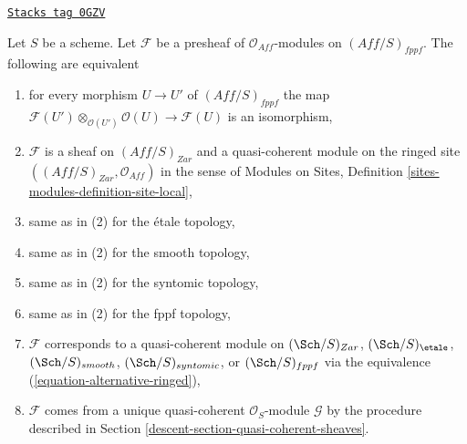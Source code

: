 \begin{lemma}
\label{descent-lemma-quasi-coherent-alternative}
\href{https://stacks.math.columbia.edu/tag/0GZV}{\texttt{Stacks tag 0GZV}}

Let $S$ be a scheme. Let $\mathcal{F}$ be a presheaf
of $\mathcal{O}_{\textit{Aff}}$-modules on $(\textit{Aff}/S)_{fppf}$.
The following are equivalent
\begin{enumerate}
\item for every morphism $U \to U'$ of $(\textit{Aff}/S)_{fppf}$ the map
$\mathcal{F}(U') \otimes_{\mathcal{O}(U')} \mathcal{O}(U) \to \mathcal{F}(U)$
is an isomorphism,
\item $\mathcal{F}$ is a sheaf on $(\textit{Aff}/S)_{Zar}$ and
a quasi-coherent module on the ringed site
$((\textit{Aff}/S)_{Zar}, \mathcal{O}_{\textit{Aff}})$ in the sense of
Modules on Sites, Definition \ref{sites-modules-definition-site-local},
\item same as in (2) for the \'etale topology,
\item same as in (2) for the smooth topology,
\item same as in (2) for the syntomic topology,
\item same as in (2) for the fppf topology,
\item $\mathcal{F}$ corresponds to a quasi-coherent module on
$(\Sch/S)_{Zar}$,
$(\Sch/S)_\etale$,
$(\Sch/S)_{smooth}$,
$(\Sch/S)_{syntomic}$, or
$(\Sch/S)_{fppf}$
via the equivalence (\ref{equation-alternative-ringed}),
\item $\mathcal{F}$ comes from a unique quasi-coherent
$\mathcal{O}_S$-module $\mathcal{G}$ by the procedure
described in Section \ref{descent-section-quasi-coherent-sheaves}.
\end{enumerate}
\end{lemma}

